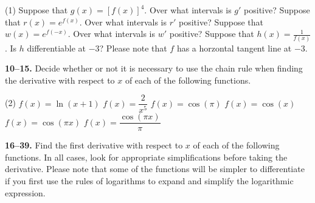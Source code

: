 \documentclass[10pt,oneside,]{book}
\theoremstyle{plain}
\theoremstyle{definition}
\numberwithin{equation}{section}
\newcommand{\fe}[2]{#1\mathopen{}\left(#2\right)\mathclose{}}
\newcommand{\fd}[1]{#1'}
\begin{document}
\par
\begin{exercisegroup}(1)
\exercise[6.]\hypertarget{exercise-488}{\null}Suppose that \(\fe{g}{x}=\left[\fe{f}{x}\right]^4\). Over what intervals is \(\fd{g}\) positive?%
\exercise[7.]\hypertarget{exercise-489}{\null}Suppose that \(\fe{r}{x}=e^{\fe{f}{x}}\). Over what intervals is \(\fd{r}\) positive?%
\exercise[8.]\hypertarget{exercise-490}{\null}Suppose that \(\fe{w}{x}=e^{\fe{f}{-x}}\). Over what intervals is \(\fd{w}\) positive?%
\exercise[9.]\hypertarget{exercise-491}{\null}Suppose that \(\fe{h}{x}=\frac{1}{\fe{f}{x}}\). Is \(h\) differentiable at \(-3\)? Please note that \(f\) has a horzontal tangent line at \(-3\).%
\end{exercisegroup}
\par\smallskip\noindent
\textbf{10--15. }\hypertarget{exercisegroup-102}{\null}Decide whether or not it is necessary to use the chain rule when finding the derivative with respect to \(x\) of each of the following functions.%
\par
\begin{exercisegroup}(2)
\exercise[10.]\hypertarget{exercise-492}{\null}\(\fe{f}{x}=\fe{\ln}{x+1}\)%
\exercise[11.]\hypertarget{exercise-493}{\null}\(\fe{f}{x}=\dfrac{2}{x^5}\)%
\exercise[12.]\hypertarget{exercise-494}{\null}\(\fe{f}{x}=\fe{\cos}{\pi}\)%
\exercise[13.]\hypertarget{exercise-495}{\null}\(\fe{f}{x}=\fe{\cos}{x}\)%
\exercise[14.]\hypertarget{exercise-496}{\null}\(\fe{f}{x}=\fe{\cos}{\pi x}\)%
\exercise[15.]\hypertarget{exercise-497}{\null}\(\fe{f}{x}=\dfrac{\fe{\cos}{\pi x}}{\pi}\)%
\end{exercisegroup}
\par\smallskip\noindent
\textbf{16--39. }\hypertarget{exercisegroup-103}{\null}Find the first derivative with respect to \(x\) of each of the following functions.  In all cases, look for appropriate simplifications before taking the derivative.  Please note that some of the functions will be simpler to differentiate if you first use the rules of logarithms to expand and simplify the logarithmic expression.%
\par
\end{document}
